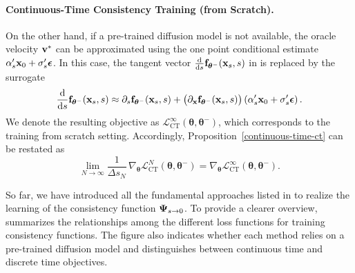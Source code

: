 \paragraph{Continuous-Time Consistency Training (from Scratch).} On the other hand, if a pre-trained diffusion model is not available, the oracle
velocity ${\mathbf{v}}^*$ can be approximated using the one point conditional estimate
$\alpha_s'{\mathbf{x}}_0 + \sigma_s'{\bm{\epsilon}}$. In this case, the tangent vector
$\tfrac{\mathop{}\!\mathrm{d}}{\mathop{}\!\mathrm{d} s}{\mathbf{f}}_{{\bm{\theta}}^-}({\mathbf{x}}_s,s)$ in
 is replaced by the surrogate
\begin{align}\label{eq:ct-continuous-time}
    \frac{\mathop{}\!\mathrm{d}}{\mathop{}\!\mathrm{d} s}{\mathbf{f}}_{{\bm{\theta}}^-}({\mathbf{x}}_s,s) 
     \approx 
    \partial_s {\mathbf{f}}_{{\bm{\theta}}^-}({\mathbf{x}}_s,s)
    + \big(\partial_{{\mathbf{x}}}{\mathbf{f}}_{{\bm{\theta}}^-}({\mathbf{x}}_s,s)\big) 
      \left(\alpha_s'{\mathbf{x}}_0 + \sigma_s'{\bm{\epsilon}}\right).
\end{align}
We denote the resulting objective as
$\mathcal{L}^\infty_{\mathrm{CT}}(\bm{\theta},\bm{\theta}^-)$, which corresponds
to the training from scratch setting. Accordingly,
Proposition~\ref{continuous-time-ct} can be restated as
\[
\lim_{N\to\infty} 
\frac{1}{\Delta s_N}\,\nabla_{\bm{\theta}} 
\mathcal{L}_{\mathrm{CT}}^{N}(\bm{\theta},\bm{\theta}^-)
=
\nabla_{\bm{\theta}} 
\mathcal{L}_{\mathrm{CT}}^{\infty}(\bm{\theta},\bm{\theta}^-).
\]



So far, we have introduced all the fundamental approaches listed in 
 to realize the learning of the consistency 
function ${\bm{\Psi}}_{s\to 0}$. 
To provide a clearer overview,  summarizes the 
relationships among the different loss functions for training consistency 
functions. 
The figure also indicates whether each method relies on a pre-trained diffusion 
model and distinguishes between continuous time and discrete time objectives.




